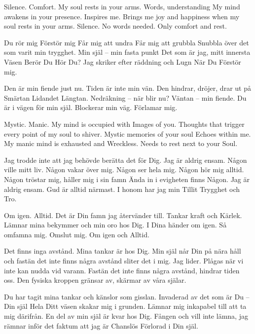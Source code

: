 \startpoem
Silence.
Comfort.
My soul rests in your arms.
Words,
understanding
My mind awakens 
in your presence.
Inspires me.
Brings me joy and
happiness
when my soul rests in your arms.
Silence.
No words needed.
Only comfort
and rest.
\stoppoem

\startpoem
Du rör mig
Förstör mig
Får mig att undra
Får mig att grubbla
Snubbla över det som varit
min trygghet.
Min själ – min fasta punkt
Det som är jag, mitt innersta
Väsen
Berör Du
Hör Du?
Jag skriker efter räddning och
Lugn
När Du 
Förstör mig.
\stoppoem

\startpoem
Den är min fiende just nu.
Tiden är inte min vän.
Den hindrar, dröjer, drar ut på
Smärtan
Lidandet
Längtan.
Nedräkning – när blir nu?
Väntan – min fiende.
Du är i vägen för min själ.
Blockerar min väg.
Förlamar mig.
\stoppoem

\startpoem
Mystic.
Manic.
My mind is occupied with
Images of you.
Thoughts that trigger every point of
my soul to shiver.
Mystic memories of your soul
Echoes within me.
My manic mind is exhausted and 
Wreckless.
Needs to rest next to your
Soul.
\stoppoem

\startpoem
Jag trodde inte att jag behövde berätta det för Dig.
Jag är aldrig ensam.
Någon ville mitt liv.
Någon vakar över mig.
Någon ser hela mig.
Någon hör mig alltid.
Någon tröstar mig, håller mig i sin famn
Ända in i evigheten finns
Någon.
Jag är aldrig ensam.
Gud är alltid närmast.
I honom har jag min 
Tillit
Trygghet och 
Tro.
\stoppoem

\startpoem
Om igen.
Alltid.
Det är Din famn jag återvänder till.
Tankar kraft och
Kärlek.
Lämnar mina bekymmer och min
oro hos Dig.
I Dina händer 
om igen. 
Så omfamna mig.
Omslut mig.
Om igen och 
Alltid.
\stoppoem

\startpoem
Det finns inga avstånd.
Mina tankar är hos Dig.
Min själ når Din på nära håll
och fastän det inte finns några avstånd
sliter det i mig. 
Jag lider.
Plågas när vi inte kan
nudda vid varann.
Fastän det inte finns några avstånd, 
hindrar  tiden oss. 
Den fysiska kroppen gränsar av,
skärmar av våra själar. 
\stoppoem

\startpoem
Du har tagit mina tankar och känslor
som gisslan.
Invaderad av det som är Du – Din själ
Hela Ditt väsen skakar mig i grunden.
Lämnar mig inkapabel till att ta mig därifrån.
En del av min själ är kvar hos Dig.
Fången
och vill inte lämna,
jag rämnar inför det faktum att jag är
Chanslös
Förlorad
i Din själ.
\stoppoem

